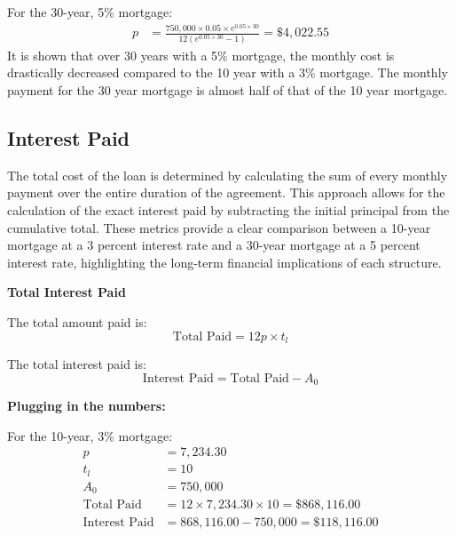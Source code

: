\documentclass{article}
\numberwithin{figure}{section}
\begin{document}
        For the 30-year, 5\% mortgage: 
        \begin{align*}
            p &= \frac{750{,}000 \times 0.05 \times e^{0.05 \times 30}}{12 (e^{0.05 \times 30} - 1)} = \$4{,}022.55
        \end{align*}
    It is shown that over 30 years with a 5\% mortgage, the monthly cost is drastically decreased compared to the 10 year with a 3\% mortgage. The monthly payment for the 30 year mortgage is almost half of that of the 10 year mortgage. 
    
    \subsection{Interest Paid}
    The total cost of the loan is determined by calculating the sum of every monthly payment over the entire duration of the agreement. This approach allows for the calculation of the exact interest paid by subtracting the initial principal from the cumulative total. These metrics provide a clear comparison between a 10-year mortgage at a 3 percent interest rate and a 30-year mortgage at a 5 percent interest rate, highlighting the long-term financial implications of each structure.
\bigbreak


        \textbf{Total Interest Paid}
        
        The total amount paid is:
        \begin{equation*}
            \text{Total Paid} = 12p \times t_l
        \end{equation*}
        
        The total interest paid is:
        \begin{equation*}
            \text{Interest Paid} = \text{Total Paid} - A_0
        \end{equation*}
        
        \textbf{Plugging in the numbers:}
        
        For the 10-year, 3\% mortgage:
        \begin{align*}
            p &= 7{,}234.30 \\
            t_l &= 10 \\
            A_0 &= 750{,}000 \\
            \text{Total Paid} &= 12 \times 7{,}234.30 \times 10 = \$868{,}116.00 \\
            \text{Interest Paid} &= 868{,}116.00 - 750{,}000 = \$118{,}116.00
        \end{align*}
        
\end{document}
